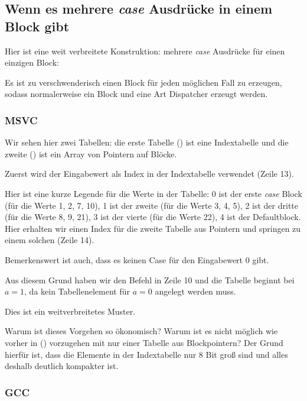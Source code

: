 \subsection{Wenn es mehrere \emph{case} Ausdrücke in einem Block gibt}
Hier ist eine weit verbreitete Konstruktion: mehrere \emph{case} Ausdrücke für einen einzigen Block:


Es ist zu verschwenderisch einen Block für jeden möglichen Fall zu erzeugen, sodass normalerweise ein Block und eine Art
Dispatcher erzeugt werden.

\subsubsection{MSVC}


Wir sehen hier zwei Tabellen: die erste Tabelle () ist eine Indextabelle und die zweite () ist
ein Array von Pointern auf Blöcke.

Zuerst wird der Eingabewert als Index in der Indextabelle verwendet (Zeile 13).

Hier ist eine kurze Legende für die Werte in der Tabelle:
0 ist der erste \emph{case} Block (für die Werte 1, 2, 7, 10),
1 ist der zweite (für die Werte 3, 4, 5),
2 ist der dritte (für die Werte 8, 9, 21),
3 ist der vierte (für die Werte 22),
4 ist der Defaultblock.
Hier erhalten wir einen Index für die zweite Tabelle aus Pointern und springen zu einem solchen (Zeile 14).

Bemerkenswert ist auch, dass es keinen Case für den Eingabewert 0 gibt. 

Aus diesem Grund haben wir den \DEC Befehl in Zeile 10 und die Tabelle beginnt bei $a=1$, da kein Tabellenelement für
$a=0$ angelegt werden muss.

Dies ist ein weitverbreitetes Muster.

Warum ist dieses Vorgehen so ökonomisch?
Warum ist es nicht möglich wie vorher in () vorzugehen mit nur einer Tabelle aus Blockpointern?
Der Grund hierfür ist, dass die Elemente in der Indextabelle nur 8 Bit groß sind und alles deshalb deutlich kompakter
ist.

\subsubsection{GCC}

